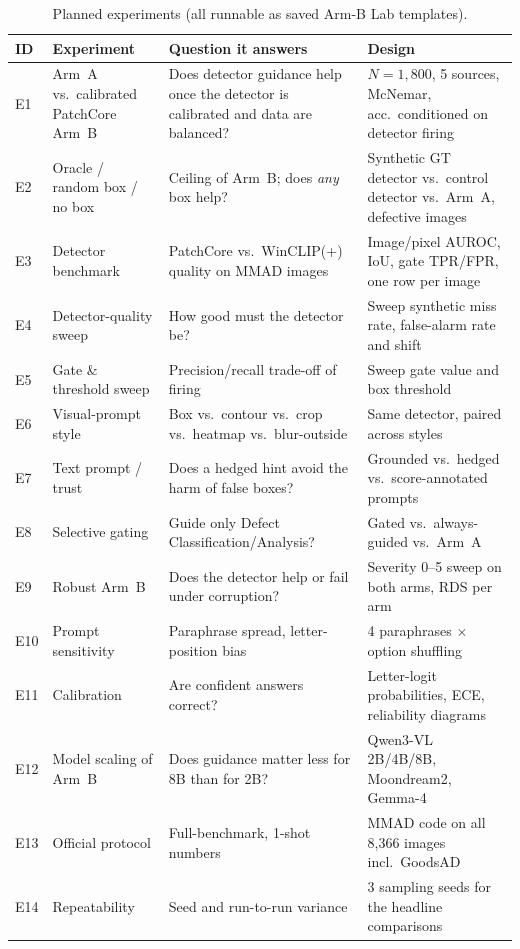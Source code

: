 \documentclass[conference]{IEEEtran}
\newcommand{\armA}{Arm~A}
\newcommand{\armB}{Arm~B}
\begin{document}
\begin{table}[t]
\centering
\caption{Planned experiments (all runnable as saved Arm-B Lab templates).}
\label{tab:roadmap}
\footnotesize
\begin{tabular}{@{}p{0.6cm}p{4.3cm}p{6.2cm}p{4.9cm}@{}}
\toprule
ID & Experiment & Question it answers & Design \\
\midrule
E1 & \armA{} vs.\ calibrated PatchCore \armB & Does detector guidance help once the detector is calibrated and data are balanced? & $N{=}1{,}800$, 5 sources, McNemar, acc.\ conditioned on detector firing \\
E2 & Oracle / random box / no box & Ceiling of \armB; does \emph{any} box help? & Synthetic GT detector vs.\ control detector vs.\ \armA, defective images \\
E3 & Detector benchmark & PatchCore vs.\ WinCLIP(+) quality on MMAD images & Image/pixel AUROC, IoU, gate TPR/FPR, one row per image \\
E4 & Detector-quality sweep & How good must the detector be? & Sweep synthetic miss rate, false-alarm rate and shift \\
E5 & Gate \& threshold sweep & Precision/recall trade-off of firing & Sweep gate value and box threshold \\
E6 & Visual-prompt style & Box vs.\ contour vs.\ crop vs.\ heatmap vs.\ blur-outside & Same detector, paired across styles \\
E7 & Text prompt / trust & Does a hedged hint avoid the harm of false boxes? & Grounded vs.\ hedged vs.\ score-annotated prompts \\
E8 & Selective gating & Guide only Defect Classification/Analysis? & Gated vs.\ always-guided vs.\ \armA \\
E9 & Robust \armB & Does the detector help or fail under corruption? & Severity 0--5 sweep on both arms, RDS per arm \\
E10 & Prompt sensitivity & Paraphrase spread, letter-position bias & 4 paraphrases $\times$ option shuffling \\
E11 & Calibration & Are confident answers correct? & Letter-logit probabilities, ECE, reliability diagrams \\
E12 & Model scaling of \armB & Does guidance matter less for 8B than for 2B? & Qwen3-VL 2B/4B/8B, Moondream2, Gemma-4 \\
E13 & Official protocol & Full-benchmark, 1-shot numbers & MMAD code on all 8{,}366 images incl.\ GoodsAD \\
E14 & Repeatability & Seed and run-to-run variance & 3 sampling seeds for the headline comparisons \\
\bottomrule
\end{tabular}
\end{table}
\end{document}

